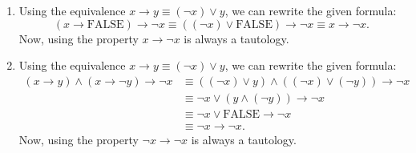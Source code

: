 \documentclass{article}
\theoremstyle{definition}
\begin{document}
\begin{solution}
    \begin{enumerate}
        \item Using the equivalence $x \rightarrow y \equiv (\neg x) \vee y$, we can rewrite the given formula:
        \[
        (x \rightarrow \mathrm{FALSE}) \rightarrow \neg x \equiv ((\neg x) \vee \mathrm{FALSE}) \rightarrow \neg x \equiv x \rightarrow \neg x.
        \]
        Now, using the property $x \rightarrow \neg x$ is always a tautology.
        
        \item Using the equivalence $x \rightarrow y \equiv (\neg x) \vee y$, we can rewrite the given formula:
        \begin{align*}
        (x \rightarrow y) \wedge (x \rightarrow \neg y) \rightarrow \neg x &\equiv ((\neg x) \vee y) \wedge ((\neg x) \vee (\neg y)) \rightarrow \neg x\\
        &\equiv \neg x \vee (y \wedge (\neg y)) \rightarrow \neg x\\
        &\equiv \neg x \vee \mathrm{FALSE} \rightarrow \neg x \\
        &\equiv \neg x \rightarrow \neg x.
        \end{align*}
        Now, using the property $\neg x \rightarrow \neg x$ is always a tautology.
    \end{enumerate}
\end{solution}
\end{document}
